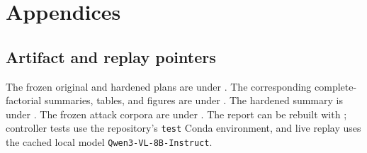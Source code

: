 \documentclass[journal]{IEEEtran}
\begin{document}
\nocite{*}



\newpage
\section*{Appendices}

\subsection*{Artifact and replay pointers}

The frozen original and hardened plans are under .  The
corresponding complete-factorial summaries, tables, and figures are under
.  The hardened summary is
under .  The frozen attack
corpora are under .  The report can be rebuilt with
; controller tests use the repository's
\texttt{test} Conda environment, and live replay uses the cached local model
\texttt{Qwen3-VL-8B-Instruct}.
\end{document}

